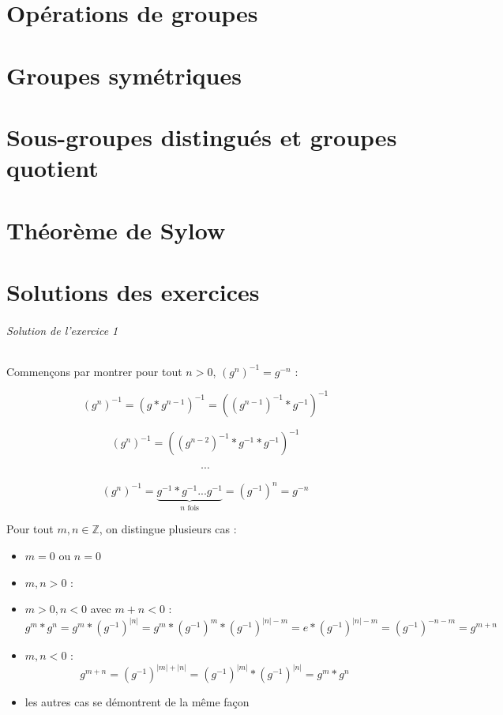 \documentclass[]{article}
\theoremstyle{remark}
\theoremstyle{definition}
\begin{document}
\part{Opérations de groupes}
\part{Groupes symétriques}
\part{Sous-groupes distingués et groupes quotient}
\part{Théorème de Sylow}

\part{Solutions des exercices}

\paragraph{Solution de l'exercice 1}

Commençons par montrer pour tout $n > 0$, $( g^n )^{-1} = g^{-n}$ :

$$\left( g^n \right)^{-1} = (g * g^{n-1})^{-1} = ((g^{n-1})^{-1}*g^{-1})^{-1}$$

$$\left( g^n \right)^{-1} = ((g^{n-2})^{-1}*g^{-1}*g^{-1})^{-1}$$

$$\cdots$$

$$\left( g^n \right)^{-1} = \underbrace{g^{-1}*g^{-1} ... g^{-1}}_{n \text{ fois}} = (g^{-1})^n = g^{-n}$$

Pour tout $m, n \in \mathbb{Z}$, on distingue plusieurs cas :
\begin{itemize}
	\item $m = 0$ ou $n = 0$ \checkmark
	\item $m, n > 0$ : \checkmark
	\item $m > 0, n < 0$ avec $m + n < 0$ : $$g^m * g^n = g^m * \left(g^{-1}\right)^{|n|} = g^m*\left(g^{-1}\right)^m*\left(g^{-1}\right)^{|n| - m} = e * \left(g^{-1}\right)^{|n|-m}=\left(g^{-1}\right)^{-n-m}=g^{m+n}$$
	\item $m, n < 0$ : $$g^{m+n}=\left(g^{-1}\right)^{|m|+|n|}=\left(g^{-1}\right)^{|m|}*\left(g^{-1}\right)^{|n|}=g^m*g^n$$
	\item les autres cas se démontrent de la même façon
\end{itemize}
\end{document}
